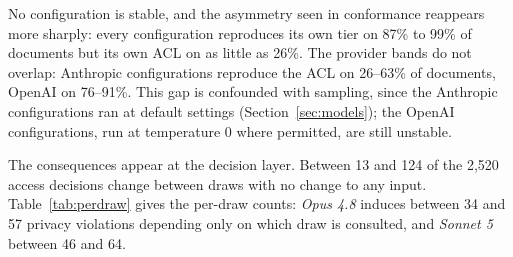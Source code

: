 \begin{table}[t]
\centering
\caption{Self-consistency across five draws. Tier, ACL, and All report the fraction of 105 documents with unanimous agreement across all draws. Unstable counts decisions that vary across draws; UUD denotes the subset denied by the authored policy.}
\label{tab:selfconsistency}
\footnotesize
\setlength{\tabcolsep}{4pt}
\end{table}

No configuration is stable, and the asymmetry seen in conformance reappears
more sharply: every configuration reproduces its own tier on 87\% to 99\% of
documents but its own ACL on as little as 26\%. The provider bands do not
overlap: Anthropic configurations reproduce the ACL on 26--63\% of documents,
OpenAI on 76--91\%. This gap is confounded with sampling, since the Anthropic
configurations ran at default settings (Section~\ref{sec:models}); the OpenAI
configurations, run at temperature 0 where permitted, are still unstable.

The consequences appear at the decision layer. Between 13 and 124 of the 2,520
access decisions change between draws with no change to any input.
Table~\ref{tab:perdraw} gives the per-draw counts: {\em Opus 4.8} induces
between 34 and 57 privacy violations depending only on which draw is consulted,
and {\em Sonnet 5} between 46 and 64.

